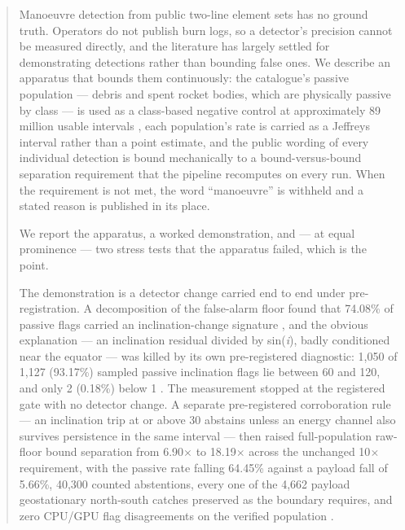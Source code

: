 \documentclass[11pt]{article}
\begin{document}
\begin{abstract}

Manoeuvre detection from public two-line element sets has no ground truth. Operators do not publish burn logs, so a detector's precision cannot be measured directly, and the literature has largely settled for demonstrating detections rather than bounding false ones. We describe an apparatus that bounds them continuously: the catalogue's passive population --- debris and spent rocket bodies, which are physically passive by class --- is used as a class-based negative control at approximately 89 million usable intervals%
, each population's rate is carried as a Jeffreys interval rather than a point estimate, and the public wording of every individual detection is bound mechanically to a bound-versus-bound separation requirement that the pipeline recomputes on every run. When the requirement is not met, the word ``manoeuvre'' is withheld and a stated reason is published in its place.

We report the apparatus, a worked demonstration, and --- at equal prominence --- two stress tests that the apparatus failed, which is the point.

The demonstration is a detector change carried end to end under pre-registration. A decomposition of the false-alarm floor found that 74.08\% of passive flags carried an inclination-change signature%
, and the obvious explanation --- an inclination residual divided by sin(\emph{i}), badly conditioned near the equator --- was killed by its own pre-registered diagnostic: 1,050 of 1,127 (93.17\%) sampled passive inclination flags lie between 60\textdegree{} and 120\textdegree{}, and only 2 (0.18\%) below 1\textdegree{}%
. The measurement stopped at the registered gate with no detector change. A separate pre-registered corroboration rule --- an inclination trip at or above 30\textdegree{} abstains unless an energy channel also survives persistence in the same interval --- then raised full-population raw-floor bound separation from 6.90$\times$ to 18.19$\times$ across the unchanged 10$\times$ requirement, with the passive rate falling 64.45\% against a payload fall of 5.66\%, 40,300 counted abstentions, every one of the 4,662 payload geostationary north-south catches preserved as the boundary requires, and zero CPU/GPU flag disagreements on the verified population%
.


\end{abstract}
\end{document}
